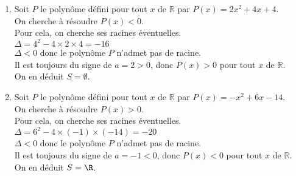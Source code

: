 \documentclass[a4paper,11pt,exos]{nsi} %
\begin{document}
        \begin{enumerate}[itemsep=1em]
        \item Soit $P$ le polynôme défini pour tout $x$ de $\mathbb R$ par $P(x)=2x^2+4x+4$.\\On cherche à résoudre $P(x)< 0$.\\Pour cela, on cherche ses racines éventuelles.\\$\Delta = 4^2-4\times2\times4=-16$\\$\Delta<0$ donc le polynôme $P$ n'admet pas de racine.\\ Il est toujours du signe de $a=2>0$, donc $P(x)>0$ pour tout $x$ de $\mathbb{R}$.\\ On en déduit $S=\emptyset$.
        
        \item Soit $P$ le polynôme défini pour tout $x$ de $\mathbb R$ par $P(x)=-x^2+6x-14$.\\On cherche à résoudre $P(x)> 0$.\\Pour cela, on cherche ses racines éventuelles.\\$\Delta = 6^2-4\times(-1)\times(-14)=-20$\\$\Delta<0$ donc le polynôme $P$ n'admet pas de racine.\\ Il est toujours du signe de $a=-1<0$, donc $P(x)<0$ pour tout $x$ de $\mathbb{R}$.\\ On en déduit $S=\R$.
        

\end{enumerate}
\end{document}
